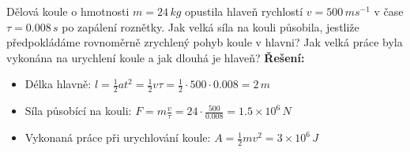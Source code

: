   \begin{example} Dělová koule o hmotnosti $m = 24\,kg$ opustila hlaveň rychlostí $v = 
    500\,ms^{-1}$ v čase $\tau=0.008\,s$ po zapálení roznětky. Jak velká síla na kouli působila, 
    jestliže předpokládáme rovnoměrně zrychlený pohyb koule v hlavni? Jak velká práce byla vykonána 
    na urychlení koule a jak dlouhá je hlaveň?\newline
    \textbf{Řešení:}
    \begin{itemize}
      \item Délka hlavně: $l=\frac{1}{2}at^2=\frac{1}{2}v\tau=\frac{1}{2}\cdot500\cdot0.008=2\,m$
      \item Síla působící na kouli: $F=m\frac{v}{\tau}=24\cdot\frac{500}{0.008}=1.5\times10^6\,N$
      \item Vykonaná práce při urychlování koule: $A=\frac{1}{2}mv^2=3\times10^6\,J$
    \end{itemize}
 \end{example} 